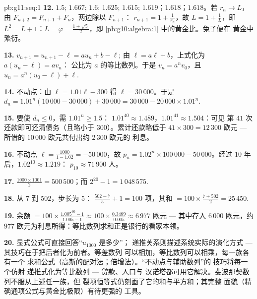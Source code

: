 \begin{solution}{pb:g11:seq:1}
\textbf{12.} $1.5$; $1.667$; $1.6$; $1.625$; $1.615$;
$1.619$；$1.618$；$1.618$。若 $r_n \to L$，由
$F_{n+2} = F_{n+1} + F_n$，两边除以 $F_{n+1}$：
$r_{n+1} = 1 + \frac{1}{r_n}$，故 $L = 1 + \frac1L$，即\
$L^2 = L + 1$：$L = \varphi = \frac{1 + \sqrt5}{2}$，即
\cref{pb:g10:algebra:1} 中的黄金比。兔子便在
黄金中繁衍。

\textbf{13.} $v_{n+1} = u_{n+1} - \ell = a u_n + b - \ell$;
由 $\ell = a\ell + b$，上式化为 $a(u_n - \ell) = a v_n$：
公比为 $a$ 的等比数列。于是 $v_n = a^n v_0$，且
$u_n = a^n (u_0 - \ell) + \ell$.

\textbf{14.} 不动点：由 $\ell = 1.01\ell - 300$ 得
$\ell = 30\,000$。于是
$d_n = 1.01^n (10\,000 - 30\,000) + 30\,000
= 30\,000 - 20\,000 \times 1.01^n$.

\textbf{15.} 要使 $d_n \leq 0$，需 $1.01^n \geq 1.5$：
$1.01^{40} \approx 1.489$，$1.01^{41} \approx 1.504$：可见
第 $41$ 次还款即可还清债务（且略小于
$300$）。累计还款略低于 $41 \times 300 = 12\,300$
欧元 --- 所借的 $10\,000$ 欧元共付出约 $2\,300$ 欧元的
利息。

\textbf{16.} 不动点 $\ell = \frac{1000}{1 - 1.02} =
-50\,000$，故 $p_n = 1.02^n \times 100\,000 - 50\,000$。经过
$10$ 年后，$1.02^{10} \approx 1.219$：
$p_{10} \approx 71\,900$ 人。

\textbf{17.} $\frac{1000 \times 1001}{2} = 500\,500$；而
$2^{20} - 1 = 1\,048\,575$.

\textbf{18.} 从 $7$ 到 $502$，步长为 $5$：
$\frac{502 - 7}{5} + 1 = 100$ 项，其和
$= 100 \times \frac{7 + 502}{2} = 25\,450$.

\textbf{19.} 余额 $= 100 \times \frac{1.005^{60} - 1}
{1.005 - 1} \approx 100 \times \frac{0.3489}{0.005} \approx
6\,977$ 欧元 --- 其中存入 $6\,000$ 欧元，约 $977$
欧元为利息所得：等比数列求和正是银行的看家本领。

\textbf{20.} 显式公式可直接回答“$u_{1000}$ 是多少”；
递推关系则描述系统实际的演化方式 ---
其技巧在于把后者化为前者。等差数列
可以相加，等比数列可以相乘，每一族各有一个
求和公式（高斯的配对法；倍增法）。“不动点与辅助数列”的
技巧将每一个仿射
递推式化为等比数列 --- 贷款、人口与
汉诺塔都可用它解决。斐波那契数列不服从上述任一族，但
裂项恒等式仍刻画了它的和与平方和；其完整
面貌（精确通项公式与黄金比极限）有待更强的
工具。
\end{solution}
